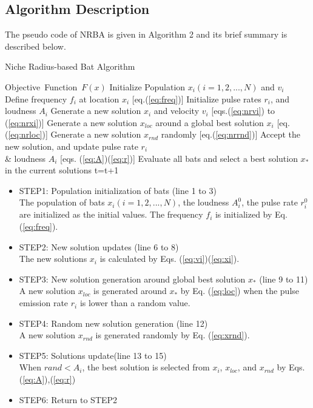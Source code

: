 \documentclass[conference]{IEEEtran}
\begin{document}
\subsection{Algorithm Description}
The pseudo code of NRBA is given in Algorithm 2 and its brief summary is described below.
\begin{algorithm}[H]
\caption{Niche Radius-based Bat Algorithm}
\label{code:ba}
\begin{algorithmic}[2]
\REQUIRE Objective\ Function\ $F(x)$
\STATE Initialize Population $x_i(i=1,2,..., N)$ and $v_i$\\
\STATE Define frequency $f_i$ at location $x_i$ [eq.(\ref{eq:freq})]
\STATE Initialize pulse rates $r_i$, and loudness $A_i$
\STATE Generate a new solution $x_i$ and velocity $v_i$ [eqs.(\ref{eq:nrvi}) to (\ref{eq:nrxi})]
\ENDIF
{}
\STATE Generate a new solution $x_{loc}$ around a global best solution $x_i$ [eq.(\ref{eq:nrloc})] 
\ENDIF
\STATE Generate a new solution $x_{rnd}$ randomly [eq.(\ref{eq:nrrnd})]
\STATE Accept the new solution, and update pulse rate $r_i$ \\ \& loudness $A_i$ [eqs. (\ref{eq:A})(\ref{eq:r})]  
\ENDIF
\STATE Evaluate all bats and select a best solution $x_*$ in the current solutions
\ENDFOR
\STATE t=t+1
\ENDWHILE
\end{algorithmic}
\end{algorithm}

\begin{itemize}
\item STEP1: Population initialization of bats (line 1 to 3)\\
The population of bats ${x_i}(i=1, 2, ..., N)$, the loudness ${A_i^0}$, the pulse rate ${r_i^0}$ are initialized as the initial values. The frequency ${f_i}$ is initialized by Eq.(\ref{eq:freq}).
\item STEP2: New solution updates (line 6 to 8)\\
The new solutions ${x_i}$ is calculated by Eqs. (\ref{eq:vi})(\ref{eq:xi}).
\item STEP3: New solution generation around global best solution ${x_*}$ (line 9 to 11)\\
A new solution $x_{loc}$ is generated around $x_*$ by Eq. (\ref{eq:loc}) when the pulse emission rate $r_i$ is lower than a random value.
\item STEP4: Random new solution generation (line 12)\\
A new solution ${x_{rnd}}$ is generated randomly by Eq. (\ref{eq:xrnd}).  
\item STEP5: Solutions update(line 13 to 15)\\
When ${rand < A_i}$, the best solution is selected from $x_i$, ${x_{loc}}$, and ${x_{rnd}}$ by Eqs.(\ref{eq:A}),(\ref{eq:r})
\item STEP6: Return to STEP2 
\end{itemize}
\end{document}
